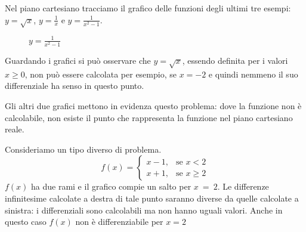 Nel piano cartesiano tracciamo il grafico delle funzioni degli ultimi 
tre esempi: $y=\sqrt{x}$, $y=\frac{1}{x}$ e $y=\frac{1}{x^2-1}$.
\begin{figure}[h]
\begin{inaccessibleblock}
 \begin{center}
 \begin{minipage}[]{.23 \textwidth}
  \radice
  \vspace*{-5mm} 
  \caption{$y=\sqrt{x}$}
 \end{minipage} 
 \begin{minipage}[]{.37 \textwidth}
  \iperbole
  \caption{$y=\frac{1}{x}$}
 \end{minipage} 
 \begin{minipage}[]{.37 \textwidth}
  \iperbolequad
  \caption{$y=\frac{1}{x^2-1}$}
 \end{minipage}
 \end{center}
\end{inaccessibleblock}
\label{fig:diff01_grafici}
\end{figure}

Guardando i grafici si può osservare che $y=\sqrt{x}$, essendo definita per 
i valori $x\ge 0$, 
non può essere calcolata per esempio, se $x=-2$ e quindi nemmeno il suo 
differenziale ha senso in questo punto.

Gli altri due grafici mettono in evidenza questo problema: dove la funzione 
non è calcolabile, non esiste il punto che rappresenta la funzione nel 
piano cartesiano reale. 

\begin{inaccessibleblock}
 \begin{center}
 \begin{minipage}[]{.38 \textwidth}
  \salto
 \end{minipage} 
 \hfill
 \begin{minipage}[]{.58 \textwidth}
Consideriamo un tipo diverso di problema.\\
\[f(x)=\begin{cases} 
x-1, & \mbox{se }x<2 \\ 
x+1, & \mbox{se }x\ge 2
\end{cases}
\]
$f(x)$ ha due rami e il grafico compie un salto per $x~=~2$. Le differenze
infinitesime calcolate a destra di tale punto saranno diverse da quelle 
calcolate a sinistra: i differenziali sono calcolabili ma non hanno
uguali valori. Anche in questo caso $f(x)$ non è differenziabile per $x=2$
 \end{minipage}
 \end{center}
\end{inaccessibleblock}
\label{fig:diff01_salto}

